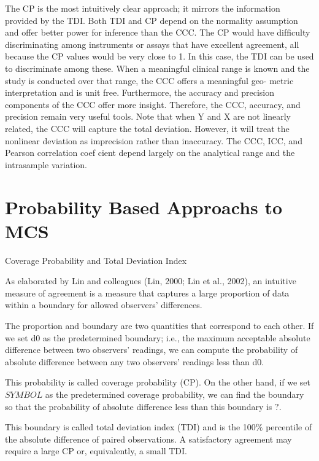 \documentclass[12pt, a4paper]{report}
\theoremstyle{plain}
\theoremstyle{definition}
\theoremstyle{remark}
\begin{document}
The CP is the most intuitively clear approach; it mirrors the information provided by the TDI. 
Both TDI and CP depend on the normality assumption and offer better power
for inference than the CCC. The CP would have difficulty discriminating among instruments or 
assays that have excellent agreement, all because the CP values would be very close to
1. In this case, the TDI can be used to discriminate among these. When a meaningful clinical range is known and the study is conducted over that range, the CCC offers a meaningful geo- metric interpretation and is unit free. Furthermore, the accuracy and precision components of the CCC offer more insight. Therefore, the CCC, accuracy, and precision remain very useful tools. Note that when Y and X are not linearly related, the CCC will capture the total deviation. However, it will treat the nonlinear deviation as imprecision rather than inaccuracy. The CCC, ICC, and Pearson correlation coef cient depend
largely on the analytical range and the intrasample variation.


\section{Probability Based Approachs to MCS}


Coverage Probability and Total Deviation Index

As elaborated by Lin and colleagues (Lin, 2000; Lin et al., 2002), an intuitive measure of
agreement is a measure that captures a large proportion of data within a boundary for allowed
observers’ differences. 

The proportion and boundary are two quantities that correspond to
each other. If we set d0 as the predetermined boundary; i.e., the maximum acceptable
absolute difference between two observers’ readings, we can compute the probability of absolute
difference between any two observers’ readings less than d0. 

This probability is called
coverage probability (CP). On the other hand, if we set $SYMBOL$ as the predetermined coverage
probability, we can find the boundary so that the probability of absolute difference less than this boundary is $?$. 


This boundary is called total deviation index (TDI) and is the 
100$\%$
percentile of the absolute difference of paired observations. A satisfactory agreement may
require a large CP or, equivalently, a small TDI.
%
\end{document}
